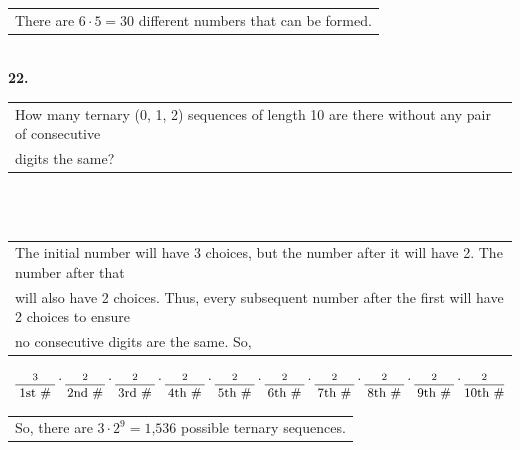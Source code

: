 \documentclass[12pt, letterpaper]{article}
\begin{document}
            \indent \indent \begin{tabular}[t]{l}
                There are $6 \cdot 5 = \boxed{\text{30}}$ different numbers that can be formed.
                \end{tabular} \\
    \textbf{22.} \begin{tabular}[t]{l} 
        How many ternary (0, 1, 2) sequences of length 10 are there without any pair of consecutive \\
        digits the same?
    \end{tabular} \\ \\
    \begin{tabular}[t]{l}
        The initial number will have 3 choices, but the number after it will have 2. The number after that \\
       will also have 2 choices. Thus, every subsequent number after the first will have 2 choices to ensure \\ 
       no consecutive digits are the same. So,
        \end{tabular}
        \[
            \underset{\text{\small 1st \#}}{\overset{3}{\underline{\hspace{1cm}}}} \cdot
            \underset{\text{\small 2nd \#}}{\overset{2}{\underline{\hspace{1cm}}}} \cdot
            \underset{\text{\small 3rd \#}}{\overset{2}{\underline{\hspace{1cm}}}} \cdot
            \underset{\text{\small 4th \#}}{\overset{2}{\underline{\hspace{1cm}}}} \cdot
            \underset{\text{\small 5th \#}}{\overset{2}{\underline{\hspace{1cm}}}} \cdot
            \underset{\text{\small 6th \#}}{\overset{2}{\underline{\hspace{1cm}}}} \cdot
            \underset{\text{\small 7th \#}}{\overset{2}{\underline{\hspace{1cm}}}} \cdot
            \underset{\text{\small 8th \#}}{\overset{2}{\underline{\hspace{1cm}}}} \cdot
            \underset{\text{\small 9th \#}}{\overset{2}{\underline{\hspace{1cm}}}} \cdot
            \underset{\text{\small 10th \#}}{\overset{2}{\underline{\hspace{1cm}}}}
        \]
        \indent \indent \begin{tabular}[t]{l}
            So, there are $3 \cdot 2^9 = \boxed{\text{1,536}}$ possible ternary sequences.
        \end{tabular} \\
\end{document}

